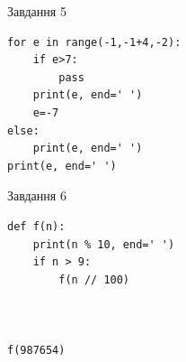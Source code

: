 \documentclass[12pt, ukrainian]{article}
\begin{document}
{\vspace{15mm}
\begin{minipage}[t]{9.7cm}                
{\begin{center}Завдання {5}\end{center}}
\begin{verbatim}
for e in range(-1,-1+4,-2):
    if e>7:
        pass
    print(e, end=' ')
    e=-7
else:
    print(e, end=' ')
print(e, end=' ')
\end{verbatim}     
\end{minipage}
\vline \hspace{8mm}
\begin{minipage}[t]{8.0cm}                
{\begin{center}Завдання {6}\end{center}}
\begin{verbatim}
def f(n):
    print(n % 10, end=' ')
    if n > 9:
        f(n // 100)
    


f(987654)
\end{verbatim}     
\end{minipage}

}
\newpage
\end{document}
